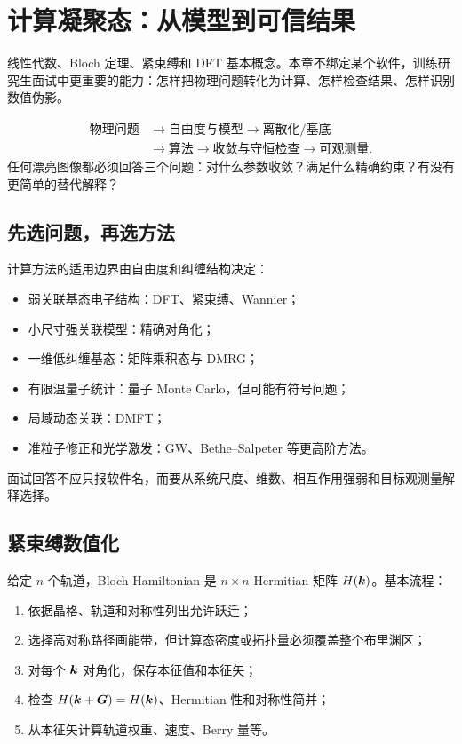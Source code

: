 \chapter{计算凝聚态：从模型到可信结果}

\begin{prereqbox}
线性代数、Bloch 定理、紧束缚和 DFT 基本概念。本章不绑定某个软件，训练研究生面试中更重要的能力：怎样把物理问题转化为计算、怎样检查结果、怎样识别数值伪影。
\end{prereqbox}
\begin{mapbox}
\[
\begin{aligned}
\text{物理问题}&\to\text{自由度与模型}\to\text{离散化/基底}\\
&\to\text{算法}\to\text{收敛与守恒检查}\to\text{可观测量}.
\end{aligned}
\]
任何漂亮图像都必须回答三个问题：对什么参数收敛？满足什么精确约束？有没有更简单的替代解释？
\end{mapbox}

\section{先选问题，再选方法}
计算方法的适用边界由自由度和纠缠结构决定：
\begin{itemize}
\item 弱关联基态电子结构：DFT、紧束缚、Wannier；
\item 小尺寸强关联模型：精确对角化；
\item 一维低纠缠基态：矩阵乘积态与 DMRG；
\item 有限温量子统计：量子 Monte Carlo，但可能有符号问题；
\item 局域动态关联：DMFT；
\item 准粒子修正和光学激发：GW、Bethe--Salpeter 等更高阶方法。
\end{itemize}
面试回答不应只报软件名，而要从系统尺度、维数、相互作用强弱和目标观测量解释选择。

\section{紧束缚数值化}
给定 $n$ 个轨道，Bloch Hamiltonian 是 $n\times n$ Hermitian 矩阵
$H(\bm{k})$。基本流程：
\begin{enumerate}
\item 依据晶格、轨道和对称性列出允许跃迁；
\item 选择高对称路径画能带，但计算态密度或拓扑量必须覆盖整个布里渊区；
\item 对每个 $\bm{k}$ 对角化，保存本征值和本征矢；
\item 检查 $H(\bm{k}+\bm{G})=H(\bm{k})$、Hermitian 性和对称性简并；
\item 从本征矢计算轨道权重、速度、Berry 量等。
\end{enumerate}

